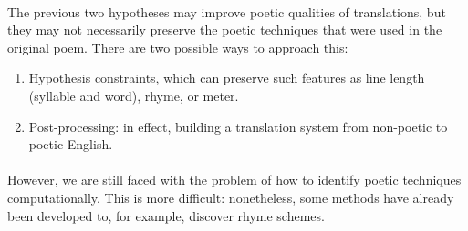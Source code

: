 \paragraph{}{The previous two hypotheses may improve poetic qualities
  of translations, but they may not necessarily preserve the poetic
  techniques that were used in the original poem. There are two
  possible ways to approach this:}
\begin{enumerate}
\item Hypothesis constraints, which can preserve such features as line
  length (syllable and word), rhyme, or meter. \cite{genzel}
\item Post-processing: in effect, building a translation system from
  non-poetic to poetic English.
\end{enumerate}

\paragraph{}{However, we are still faced with the problem of how to
  identify poetic techniques computationally. This is more difficult:
  nonetheless, some methods have already been developed to, for
  example, discover rhyme schemes.}
